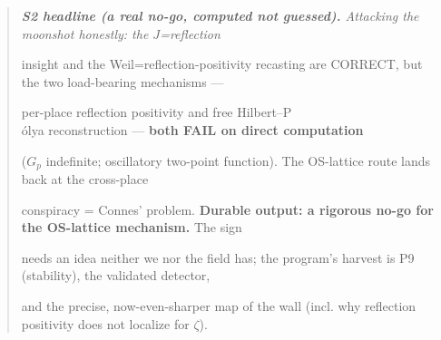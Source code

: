 \documentclass[10pt]{article}
\begin{document}
\begin{quote}\itshape
\textbf{S2 headline (a real no-go, computed not guessed).} Attacking the moonshot honestly: the $J$=reflection\par
insight and the Weil=reflection-positivity recasting are CORRECT, but the two load-bearing mechanisms ---\par
per-place reflection positivity and free Hilbert--P\\\'olya reconstruction --- \textbf{both FAIL on direct computation}\par
($G_p$ indefinite; oscillatory two-point function). The OS-lattice route lands back at the cross-place\par
conspiracy = Connes' problem. \textbf{Durable output: a rigorous no-go for the OS-lattice mechanism.} The sign\par
needs an idea neither we nor the field has; the program's harvest is P9 (stability), the validated detector,\par
and the precise, now-even-sharper map of the wall (incl. why reflection positivity does not localize for \ensuremath{\zeta}).\par
\end{quote}
\end{document}
